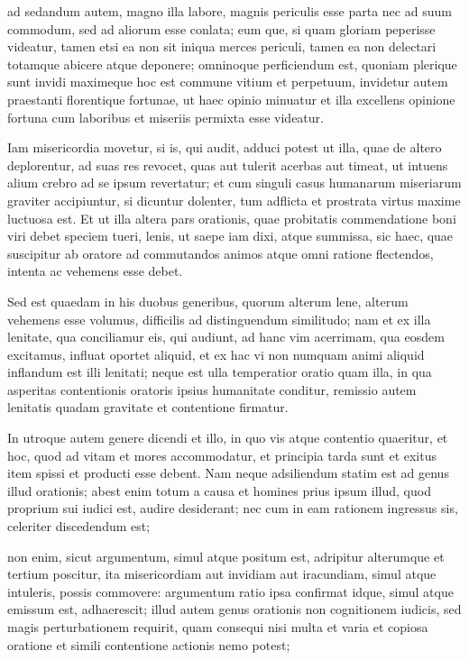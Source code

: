  ad sedandum autem, magno illa labore, magnis periculis esse parta nec ad suum commodum, sed ad aliorum esse conlata; eum que, si quam gloriam peperisse videatur, tamen etsi ea non sit iniqua merces periculi, tamen ea non delectari totamque abicere atque deponere; omninoque perficiendum est, quoniam plerique sunt invidi maximeque hoc est commune vitium et perpetuum, invidetur autem praestanti florentique fortunae, ut haec opinio minuatur et illa excellens opinione fortuna cum laboribus et miseriis permixta esse videatur.

 Iam misericordia movetur, si is, qui audit, adduci potest ut illa, quae de altero deplorentur, ad suas res revocet, quas aut tulerit acerbas aut timeat, ut intuens alium crebro ad se ipsum revertatur; et cum singuli casus humanarum miseriarum graviter accipiuntur, si dicuntur dolenter, tum adflicta et prostrata virtus maxime luctuosa est. Et ut illa altera pars orationis, quae probitatis commendatione boni viri debet speciem tueri, lenis, ut saepe iam dixi, atque summissa, sic haec, quae suscipitur ab oratore ad commutandos animos atque omni ratione flectendos, intenta ac vehemens esse debet.

 Sed est quaedam in his duobus generibus, quorum alterum lene, alterum vehemens esse volumus, difficilis ad distinguendum similitudo; nam et ex illa lenitate, qua conciliamur eis, qui audiunt, ad hanc vim acerrimam, qua eosdem excitamus, influat oportet aliquid, et ex hac vi non numquam animi aliquid inflandum est illi lenitati; neque est ulla temperatior oratio quam illa, in qua asperitas contentionis oratoris ipsius humanitate conditur, remissio autem lenitatis quadam gravitate et contentione firmatur.

 In utroque autem genere dicendi et illo, in quo vis atque contentio quaeritur, et hoc, quod ad vitam et mores accommodatur, et principia tarda sunt et exitus item spissi et producti esse debent. Nam neque adsiliendum statim est ad genus illud orationis; abest enim totum a causa et homines prius ipsum illud, quod proprium sui iudici est, audire desiderant; nec cum in eam rationem ingressus sis, celeriter discedendum est;

 non enim, sicut argumentum, simul atque positum est, adripitur alterumque et tertium poscitur, ita misericordiam aut invidiam aut iracundiam, simul atque intuleris, possis commovere: argumentum ratio ipsa confirmat idque, simul atque emissum est, adhaerescit; illud autem genus orationis non cognitionem iudicis, sed magis perturbationem requirit, quam consequi nisi multa et varia et copiosa oratione et simili contentione actionis nemo potest;

